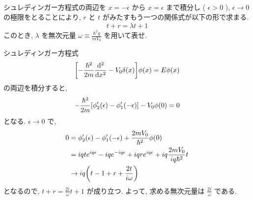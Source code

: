 \documentclass[../../ou-physics-exam.tex]{subfiles}
\begin{document}
シュレディンガー方程式の両辺を $ x = - \epsilon $ から $ x = \epsilon $ まで積分し ( $ \epsilon > 0 $ ), $ \epsilon \to 0 $ の極限をとることにより, $ r $ と $ t $ がみたすもう一つの関係式が以下の形で求まる.
\begin{align*}
    t + r = \lambda t + 1
\end{align*}
このとき, $ \lambda $ を無次元量 $ \displaystyle \omega \equiv \frac{\hbar^2 q}{mV_0} $ を用いて表せ.
\begin{answer}
    シュレディンガー方程式
    \begin{align*}
        \qty[ - \frac{\hbar^2}{2m} \dv[2]{x} - V_0 \delta (x) ] \phi (x) = E \phi (x)
    \end{align*}
    の両辺を積分すると,
    \begin{align*}
        - \frac{\hbar^2}{2m} \qty[ \phi_2'(\epsilon) - \phi_1' (- \epsilon) ] - V_0 \phi (0) = 0
    \end{align*}
    となる. 
    $ \epsilon \to 0 $ で,
    \begin{align*}
        0 
        & = \phi_2'(\epsilon) - \phi_1' (- \epsilon) + \frac{2mV_0}{\hbar^2} \phi (0) \\
        & = iqt e^{iq \epsilon } - iq e^{-iq \epsilon } + iqr e^{iq \epsilon } + iq \frac{2mV_0}{iq \hbar^2} t \\
        & \to iq \qty(t - 1 + r + \frac{2t}{i \omega})
    \end{align*}
    となるので, $ \displaystyle t + r = \frac{2i}{\omega} t + 1 $ が成り立つ. 
    よって, 求める無次元量は $ \displaystyle \frac{2i}{\omega} $ である.
\end{answer}
\end{document}
